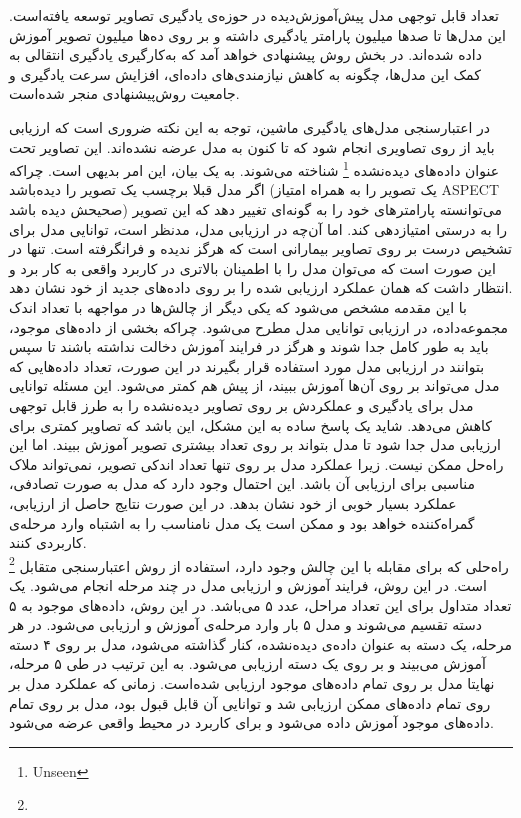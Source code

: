 تعداد قابل توجهی مدل پیش‌آموزش‌دیده در حوزه‌ی یادگیری تصاویر توسعه یافته‌است.
این مدل‌ها  تا صد‌ها میلیون پارامتر یادگیری داشته و بر روی ده‌ها میلیون تصویر آموزش داده شده‌اند. 
در بخش روش پیشنهادی خواهد آمد که به‌کارگیری یادگیری انتقالی به کمک این مدل‌ها، چگونه به کاهش نیازمندی‌های داده‌ای، افزایش سرعت یادگیری و جامعیت روش‌پیشنهادی منجر شده‌است.


در اعتبار‌سنجی مدل‌های یادگیری ماشین، توجه به این نکته ضروری است که ارزیابی باید از روی تصاویری انجام شود که تا کنون به مدل عرضه نشده‌اند.
این تصاویر تحت عنوان داده‌های دیده‌نشده
\footnote{Unseen}
 شناخته می‌شوند.
به یک بیان، این امر بدیهی است.
چراکه اگر مدل قبلا برچسب یک تصویر را دیده‌باشد (یک تصویر را به همراه امتیاز ASPECT صحیحش دیده باشد) می‌توانسته پارامتر‌های خود را به گونه‌ای تغییر دهد که این تصویر را به درستی امتیازدهی کند.
اما آن‌چه در ارزیابی مدل، مدنظر است، توانایی مدل برای تشخیص درست بر روی تصاویر بیمارانی است که هرگز ندیده و فرانگرفته است.
تنها در این صورت است که می‌توان مدل را با اطمینان بالاتری در کاربرد واقعی به کار برد و انتظار داشت که همان عملکرد ارزیابی شده را بر روی داده‌های جدید از خود نشان دهد.\\

با این مقدمه مشخص می‌شود که
یکی دیگر از چالش‌ها در مواجهه با تعداد اندک مجموعه‌داده، در ارزیابی توانایی مدل مطرح می‌شود.
چراکه بخشی از داده‌های موجود، باید به طور کامل جدا شوند و هرگز در فرایند آموزش دخالت نداشته باشند تا سپس بتوانند در ارزیابی مدل مورد استفاده قرار بگیرند
در این صورت، تعداد داده‌هایی که مدل می‌تواند بر روی آن‌ها آموزش ببیند، از پیش هم کمتر می‌شود.
این مسئله توانایی مدل برای یادگیری و عملکردش بر روی تصاویر دیده‌نشده را به طرز قابل توجهی کاهش می‌دهد.
شاید یک پاسخ ساده به این مشکل، این باشد که تصاویر کمتری برای ارزیابی مدل جدا شود تا مدل بتواند بر روی تعداد بیشتری تصویر آموزش ببیند.
اما این راه‌حل ممکن نیست.
زیرا عملکرد مدل بر روی تنها تعداد اندکی تصویر، نمی‌تواند ملاک مناسبی برای ارزیابی آن باشد.
این احتمال وجود دارد که مدل به صورت تصادفی، عملکرد بسیار خوبی از خود نشان بدهد.
در این صورت نتایج حاصل از ارزیابی،‌ گمراه‌کننده خواهد بود و ممکن است یک مدل نامناسب را به اشتباه وارد مرحله‌ی کاربردی کنند.\\

راه‌حلی که برای مقابله با این چالش وجود دارد، استفاده از روش اعتبارسنجی متقابل
\footnote{}
است.
در این روش، فرایند آموزش و ارزیابی مدل در چند مرحله انجام می‌شود.
یک تعداد متداول برای این تعداد مراحل، عدد ۵ می‌باشد.
در این روش، داده‌های موجود به ۵ دسته تقسیم می‌شوند و مدل ۵ بار وارد مرحله‌ی آموزش و ارزیابی می‌شود.
در هر مرحله، یک دسته به عنوان داده‌ی دیده‌نشده، کنار گذاشته می‌شود، مدل بر روی ۴ دسته آموزش می‌بیند و بر روی یک دسته ارزیابی می‌شود. 
به این ترتیب در طی ۵ مرحله، نهایتا مدل بر روی تمام داده‌های موجود ارزیابی شده‌است.
زمانی که عملکرد مدل بر روی تمام داده‌های ممکن ارزیابی شد و توانایی آن قابل قبول بود، مدل بر روی تمام داده‌های موجود آموزش داده‌ می‌شود و برای کاربرد در محیط واقعی عرضه می‌شود.\\

